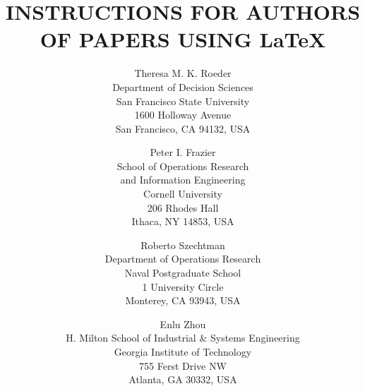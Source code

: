 \documentclass{wscpaperproc}
\theoremstyle{wsc}
\begin{document}
%
%

\title{INSTRUCTIONS FOR AUTHORS OF PAPERS USING \LaTeX}

\author{Theresa M. K. Roeder\\ [12pt]
Department of Decision Sciences \\
San Francisco State University\\
1600 Holloway Avenue\\
San Francisco, CA 94132, USA\\
\and
Peter I. Frazier\\[12pt]
School of Operations Research\\ and Information Engineering \\
Cornell University\\
206 Rhodes Hall\\
Ithaca, NY 14853, USA\\
\and
Roberto Szechtman\\ [12pt]
Department of Operations Research\\
Naval Postgraduate School\\
1 University Circle\\
Monterey, CA 93943, USA\\
\and
Enlu Zhou\\ [12pt]
H. Milton School of Industrial \& Systems Engineering\\
Georgia Institute of Technology\\
755 Ferst Drive NW\\
Atlanta, GA 30332, USA
}






\maketitle
\end{document}
